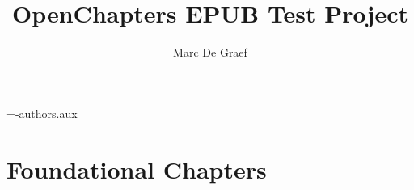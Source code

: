 \documentclass[11pt,fleqn,A4paper]{book}
\title{OpenChapters EPUB Test Project}
\author{Marc De Graef}
\begin{document}


\immediate\openout\authorfile=\jobname-authors.aux%




\part{Foundational Chapters}


\end{document}
